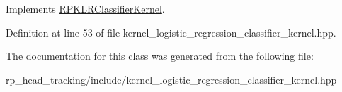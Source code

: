\-Implements \hyperlink{class_r_p_k_l_r_classifier_kernel_a39824eec9f922dc01f151632b2f05649}{\-R\-P\-K\-L\-R\-Classifier\-Kernel}.



\-Definition at line 53 of file kernel\-\_\-logistic\-\_\-regression\-\_\-classifier\-\_\-kernel.\-hpp.



\-The documentation for this class was generated from the following file\-:\begin{DoxyCompactItemize}
\item 
rp\-\_\-head\-\_\-tracking/include/kernel\-\_\-logistic\-\_\-regression\-\_\-classifier\-\_\-kernel.\-hpp\end{DoxyCompactItemize}
